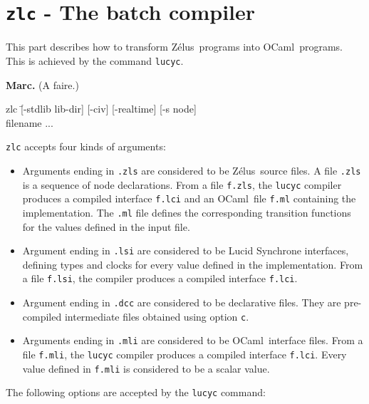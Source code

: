 \documentclass[11pt,titlepage,twoside]{report}
\newcommand{\zelus}{{\sf Z\'elus}}
\newcommand{\ocaml}{{\sf OCaml}}
\newcommand{\Marc}[1]{{\bf Marc.} ({#1})}
\begin{document}
\chapter{{\tt zlc} - The batch compiler}
This part describes how to transform \zelus\ programs into \ocaml\
programs. This is achieved by the command {\tt lucyc}.

\Marc{A faire.}

{\tt \begin{tabbing}
   zlc \= [-stdlib lib-dir]
                 [-civ]
                 [-realtime]
                 [-s node] \\
          filename ...
\end{tabbing}
}


\noindent
\verb-zlc- accepts four kinds of arguments: 

\begin{itemize}
\item
Arguments ending in \verb-.zls- are considered to be \zelus\ source
files. A file \verb-.zls- is a sequence of node declarations. From a
file \verb-f.zls-, the \verb-lucyc- compiler produces a compiled
interface \verb-f.lci- and an \ocaml\ file \verb-f.ml- containing the
implementation. The \verb-.ml- file defines the corresponding
transition functions for the values defined in the input file.
\item
Argument ending in \verb-.lsi- are considered to be Lucid Synchrone
interfaces, defining types and clocks for every value defined in the
implementation. From a file \verb-f.lsi-, 
the compiler produces a compiled interface
\verb-f.lci-.
\item
Argument ending in \verb-.dcc-
are considered to be declarative
files. They are pre-compiled intermediate files obtained using
option \verb-c-.
\item
Arguments ending in \verb-.mli- are considered to be \ocaml\
interface files. From a file \verb-f.mli-, the 
\verb-lucyc- compiler produces a compiled interface \verb-f.lci-.
Every value defined in \verb-f.mli- is considered to be a scalar value.
\end{itemize}

The following options are accepted by the \verb-lucyc- command:
\end{document}
